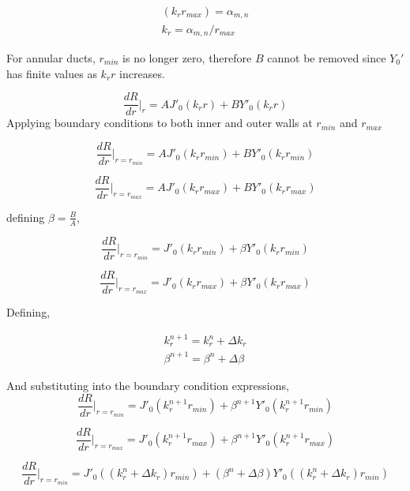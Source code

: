 \begin{align}
    (k_r r_{max})  = \alpha_{m,n} \\
    k_r = \alpha_{m,n}/r_{max}
\end{align}

For annular ducts, $r_{min}$ is no longer zero, therefore $B$ cannot be removed
since $Y_0'$ has finite values as $k_r r $ increases.

\begin{equation}
    \frac{dR}{dr}\Bigr|_{r} = A J'_0 (k_r r) + B Y'_0(k_r r ) 
    \label{eqn:besselsfunderivaTive}
\end{equation}
Applying boundary conditions to both inner and outer walls at $r_{min}$ and $r_{max}$

\begin{equation}
    \frac{dR}{dr}\Bigr|_{r=r_{min}} = A J'_0 (k_r r_{min}) + B Y'_0(k_r r_{min}) 
\end{equation}

\begin{equation}
    \frac{dR}{dr}\Bigr|_{r=r_{max}} = A J'_0 (k_r r_{max}) + B Y'_0(k_r r_{max}) 
\end{equation}

defining $\beta = \frac{B}{A}$,

\begin{equation}
    \frac{dR}{dr}\Bigr|_{r=r_{min}} =  J'_0 (k_r r_{min}) + \beta Y'_0(k_r r_{min}) 
\end{equation}

\begin{equation}
    \frac{dR}{dr}\Bigr|_{r=r_{max}} =  J'_0 (k_r r_{max}) + \beta Y'_0(k_r r_{max}) 
\end{equation}

Defining,

\begin{align*}
    k_r^{n+1} = k_r^n + \Delta k_r \\
    \beta^{n+1} = \beta^n + \Delta \beta 
\end{align*}

And substituting into the boundary condition expressions,
\begin{equation}
    \frac{dR}{dr}\Bigr|_{r=r_{min}} =  J'_0 (k_r^{n+1} r_{min}) + \beta^{n+1} Y'_0(k_r^{n+1} r_{min}) 
\end{equation}

\begin{equation}
    \frac{dR}{dr}\Bigr|_{r=r_{max}} =  J'_0 (k_r^{n+1} r_{max}) + \beta^{n+1} Y'_0(k_r^{n+1} r_{max}) 
\end{equation}

\begin{equation}
    \frac{dR}{dr}\Bigr|_{r=r_{min}} =  J'_0 (\left(k_r^{n} + \Delta k_r \right)%
    r_{min}) + %
    \left(\beta^{n}  + \Delta \beta\right) %
    Y'_0(\left(k_r^{n} + \Delta k_r \right) r_{min}) 
\end{equation}





